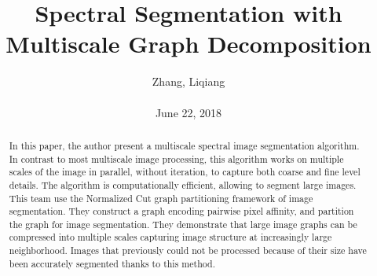 \documentclass[10pt,twocolumn,letterpaper]{article}
\title{\textbf{Spectral Segmentation with Multiscale Graph Decomposition}}
\author{Zhang, Liqiang\\\\June 22, 2018}
\begin{document}
\maketitle
\par
\begin{abstract}
  In this paper, the author present a multiscale spectral image segmentation algorithm. In contrast to most multiscale image processing, this algorithm works on multiple scales of the image in parallel, without iteration, to capture both coarse and fine level details. The algorithm is computationally efficient, allowing to segment large images. This team use the Normalized Cut graph partitioning framework of image segmentation. They construct a graph encoding pairwise pixel affinity, and partition the graph for image segmentation. They demonstrate that large image graphs can be compressed into multiple scales capturing image structure at increasingly large neighborhood. Images that previously could not be processed because of their size have been accurately segmented thanks to this method.
\end{abstract}
\end{document}
